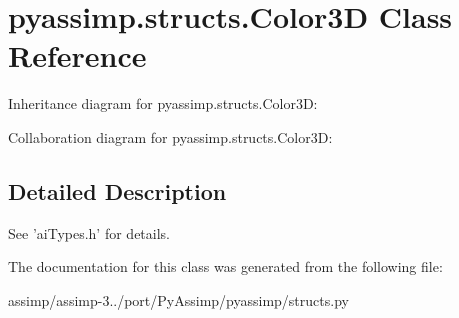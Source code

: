 \hypertarget{classpyassimp_1_1structs_1_1_color3_d}{\section{pyassimp.\+structs.\+Color3\+D Class Reference}
\label{classpyassimp_1_1structs_1_1_color3_d}
}


Inheritance diagram for pyassimp.\+structs.\+Color3\+D\+:


Collaboration diagram for pyassimp.\+structs.\+Color3\+D\+:


\subsection{Detailed Description}
\begin{DoxyVerb}See 'aiTypes.h' for details.
\end{DoxyVerb}
 

The documentation for this class was generated from the following file\+:\begin{DoxyCompactItemize}
\item 
assimp/assimp-\/3../port/\+Py\+Assimp/pyassimp/structs.\+py\end{DoxyCompactItemize}
